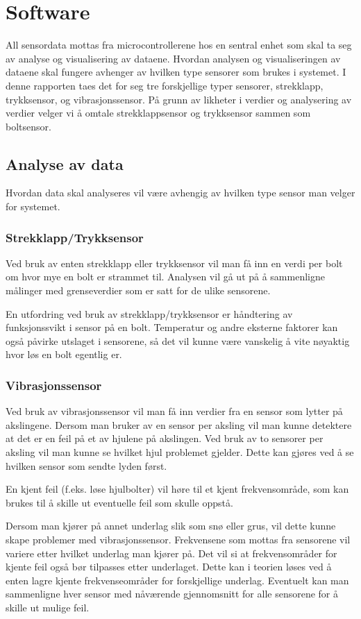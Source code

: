 \section{Software}
All sensordata mottas fra microcontrollerene hos en sentral enhet som skal ta seg 
av analyse og visualisering av dataene. Hvordan analysen og visualiseringen av 
dataene skal fungere avhenger av hvilken type sensorer som brukes i systemet. I 
denne rapporten taes det for seg tre forskjellige typer sensorer, strekklapp, 
trykksensor, og vibrasjonssensor. På grunn av likheter i verdier og analysering 
av verdier velger vi å omtale strekklappsensor og trykksensor sammen som 
boltsensor.

\subsection{Analyse av data}
Hvordan data skal analyseres vil være avhengig av hvilken type sensor man velger 
for systemet. 

\subsubsection{Strekklapp/Trykksensor}
Ved bruk av enten strekklapp eller trykksensor vil man få inn en verdi per bolt 
om hvor mye en bolt er strammet til. Analysen vil gå ut på å sammenligne målinger 
med grenseverdier som er satt for de ulike sensorene.

En utfordring ved bruk av strekklapp/trykksensor er håndtering av 
funksjonssvikt i sensor på en bolt. Temperatur og andre eksterne faktorer kan 
også påvirke utslaget i sensorene, så det vil kunne være vanskelig å vite 
nøyaktig hvor løs en bolt egentlig er.

\subsubsection{Vibrasjonssensor}
Ved bruk av vibrasjonssensor vil man få inn verdier fra en sensor som lytter på 
akslingene. Dersom man bruker av en sensor per aksling vil man kunne detektere at 
det er en feil på et av hjulene på akslingen. Ved bruk av to sensorer per aksling 
vil man kunne se hvilket hjul problemet gjelder. Dette kan gjøres ved å se 
hvilken sensor som sendte lyden først.

En kjent feil (f.eks. løse hjulbolter) vil høre til et kjent frekvensområde, som 
kan brukes til å skille ut eventuelle feil som skulle oppstå.

Dersom man kjører på annet underlag slik som snø eller grus, vil dette kunne 
skape problemer med vibrasjonssensor. Frekvensene som mottas fra sensorene vil 
variere etter hvilket underlag man kjører på. Det vil si at frekvensområder for 
kjente feil også bør tilpasses etter underlaget. Dette kan i teorien løses ved å 
enten lagre kjente frekvenseområder for forskjellige underlag. Eventuelt kan man 
sammenligne hver sensor med nåværende gjennomsnitt for alle sensorene for å 
skille ut mulige feil. 

